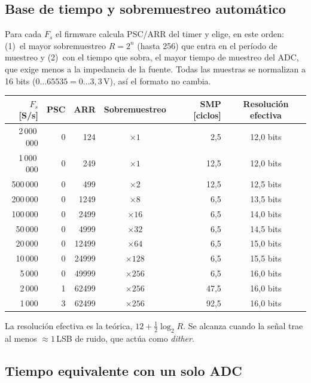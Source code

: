 \documentclass[11pt,a4paper]{article}
\begin{document}
\subsection{Base de tiempo y sobremuestreo automático}

Para cada $F_s$ el firmware calcula PSC/ARR del timer y elige, en este orden:
(1)~el mayor sobremuestreo $R = 2^n$ (hasta 256) que entra en el período de
muestreo y (2)~con el tiempo que sobra, el mayor tiempo de muestreo del ADC, que
exige menos a la impedancia de la fuente. Todas las muestras se normalizan a 16
bits ($0 \ldots 65535 = 0 \ldots 3{,}3$\,V), así el formato no cambia.

\begin{center}
\begin{tabular}{@{}rrrcrc@{}}
\toprule
$F_s$ [S/s] & PSC & ARR & Sobremuestreo & SMP [ciclos] & Resolución efectiva \\
\midrule
2\,000\,000 & 0 & 124   & $\times1$   & 2,5  & 12,0 bits \\
1\,000\,000 & 0 & 249   & $\times1$   & 12,5 & 12,0 bits \\
500\,000    & 0 & 499   & $\times2$   & 12,5 & 12,5 bits \\
200\,000    & 0 & 1249  & $\times8$   & 6,5  & 13,5 bits \\
100\,000    & 0 & 2499  & $\times16$  & 6,5  & 14,0 bits \\
50\,000     & 0 & 4999  & $\times32$  & 6,5  & 14,5 bits \\
20\,000     & 0 & 12499 & $\times64$  & 6,5  & 15,0 bits \\
10\,000     & 0 & 24999 & $\times128$ & 6,5  & 15,5 bits \\
5\,000      & 0 & 49999 & $\times256$ & 6,5  & 16,0 bits \\
2\,000      & 1 & 62499 & $\times256$ & 47,5 & 16,0 bits \\
1\,000      & 3 & 62499 & $\times256$ & 92,5 & 16,0 bits \\
\bottomrule
\end{tabular}
\end{center}
La resolución efectiva es la teórica, $12 + \frac{1}{2}\log_2 R$. Se alcanza
cuando la señal trae al menos $\approx 1$\,LSB de ruido, que actúa como
\emph{dither}.

\subsection{Tiempo equivalente con un solo ADC}
\end{document}
